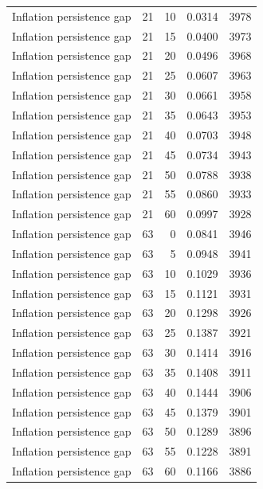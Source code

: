 \begin{tabular}{lrrrr}
Inflation persistence gap & 21 & 10 & 0.0314 & 3978 \\
Inflation persistence gap & 21 & 15 & 0.0400 & 3973 \\
Inflation persistence gap & 21 & 20 & 0.0496 & 3968 \\
Inflation persistence gap & 21 & 25 & 0.0607 & 3963 \\
Inflation persistence gap & 21 & 30 & 0.0661 & 3958 \\
Inflation persistence gap & 21 & 35 & 0.0643 & 3953 \\
Inflation persistence gap & 21 & 40 & 0.0703 & 3948 \\
Inflation persistence gap & 21 & 45 & 0.0734 & 3943 \\
Inflation persistence gap & 21 & 50 & 0.0788 & 3938 \\
Inflation persistence gap & 21 & 55 & 0.0860 & 3933 \\
Inflation persistence gap & 21 & 60 & 0.0997 & 3928 \\
Inflation persistence gap & 63 & 0 & 0.0841 & 3946 \\
Inflation persistence gap & 63 & 5 & 0.0948 & 3941 \\
Inflation persistence gap & 63 & 10 & 0.1029 & 3936 \\
Inflation persistence gap & 63 & 15 & 0.1121 & 3931 \\
Inflation persistence gap & 63 & 20 & 0.1298 & 3926 \\
Inflation persistence gap & 63 & 25 & 0.1387 & 3921 \\
Inflation persistence gap & 63 & 30 & 0.1414 & 3916 \\
Inflation persistence gap & 63 & 35 & 0.1408 & 3911 \\
Inflation persistence gap & 63 & 40 & 0.1444 & 3906 \\
Inflation persistence gap & 63 & 45 & 0.1379 & 3901 \\
Inflation persistence gap & 63 & 50 & 0.1289 & 3896 \\
Inflation persistence gap & 63 & 55 & 0.1228 & 3891 \\
Inflation persistence gap & 63 & 60 & 0.1166 & 3886 \\
\bottomrule
\end{tabular}
